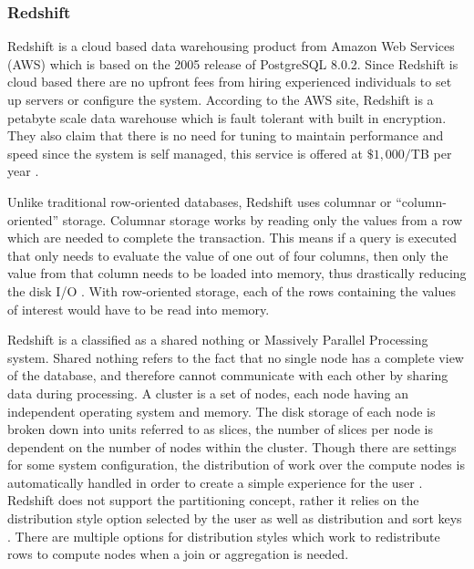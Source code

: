 \documentclass[draftclsnofoot, onecolumn, compsoc, 10pt]{IEEEtran}
\begin{document}
\subsubsection{Redshift}
Redshift is a cloud based data warehousing product from Amazon Web Services (AWS) which is based on the 2005 release of PostgreSQL 8.0.2. 
Since Redshift is cloud based there are no upfront fees from hiring experienced individuals to set up servers or configure the system.
According to the  AWS site, Redshift is a petabyte scale data warehouse which is fault tolerant with built in encryption.
They also claim that there is no need for tuning to maintain performance and speed since the system is self managed, this service is offered at $\$1,000/$TB per year \cite{General Information - Redshift}.

Unlike traditional row-oriented databases, Redshift uses columnar or “column-oriented” storage.
Columnar storage works by reading only the values from a row which are needed to complete the transaction.
This means if a query is executed that only needs to evaluate the value of one out of four columns, then only the value from that column needs to be loaded into memory, thus drastically reducing the disk I/O \cite{Tuning Query Performance}.
With row-oriented storage, each of the rows containing the values of interest would have to be read into memory.

Redshift is a classified as a shared nothing or Massively Parallel Processing system.
Shared nothing refers to the fact that no single node has a complete view of the database, and therefore cannot communicate with each other by sharing data during processing.
A cluster is a set of nodes, each node having an independent operating system and memory. The disk storage of each node is broken down into units referred to as slices, the number of slices per node is dependent on the number of nodes within the cluster.
Though there are settings for some system configuration, the distribution of work over the compute nodes is automatically handled in order to create a simple experience for the user \cite{Choosing A Data Distribution Style}.
Redshift does not support the partitioning concept, rather it relies on the distribution style option selected by the user as well as distribution and sort keys \cite{Unsupported Postgresql Features}.
There are multiple options for distribution styles which work to redistribute rows to compute nodes when a join or aggregation is needed.
\end{document}
